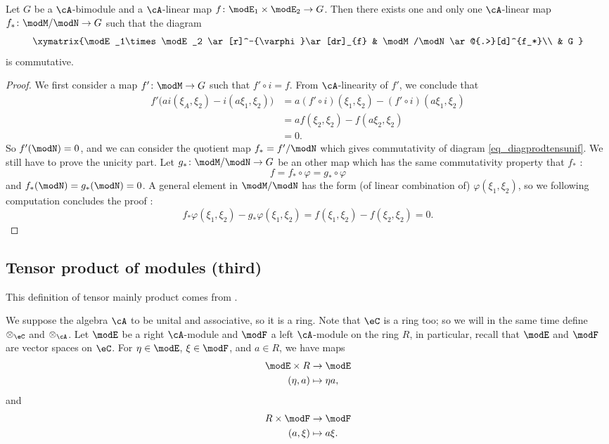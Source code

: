 \begin{proposition}
Let $G$ be a $\cA$-bimodule and a $\cA$-linear map $f\colon \modE_1\times\modE_2\to G$. Then there exists one and only one $\cA$-linear map $f_*\colon \modM/\modN\to G$ such that the diagram
\begin{equation}  \label{eq_diagprodtensunif}
\xymatrix{%
   \modE_1\times\modE_2 \ar[r]^-{\varphi}\ar[dr]_{f}		&	\modM/\modN\ar@{.>}[d]^{f_*}\\
   	&	G
}
\end{equation}
is commutative.
\end{proposition}

\begin{proof}
We first consider a map $f'\colon \modM\to G$ such that $f'\circ i=f$. From $\cA$-linearity of $f'$, we conclude that
\[ 
 \begin{split}
f'\big( ai(\xi_A,\xi_2)-i(a\xi_1,\xi_2) \big)&=a(f'\circ i)(\xi_1,\xi_2)-(f'\circ i)(a\xi_1,\xi_2)\\
		&=af(\xi_2,\xi_2)-f(a\xi_2,\xi_2)\\
		&=0.
\end{split} 
\]
So $f'(\modN)=0$, and we can consider the quotient map $f_*=f'/\modN$ which gives commutativity of diagram \eqref{eq_diagprodtensunif}. We still have to prove the unicity part. Let $g_*\colon \modM/\modN\to G$ be an other map which has the same commutativity property that $f_*$ :
\[ 
  f=f_*\circ \varphi=g_*\circ\varphi
\]
and $f_*(\modN)=g_*(\modN)=0$. A general element in $\modM/\modN$ has the form (of linear combination of) $\varphi(\xi_1,\xi_2)$, so we following computation concludes the proof :
\[ 
  f_*\varphi(\xi_1,\xi_2)-g_*\varphi(\xi_1,\xi_2)=f(\xi_1,\xi_2)-f(\xi_2,\xi_2)=0.
\]
\end{proof}

\subsection{Tensor product of modules (third)}

This definition of tensor mainly product comes from \cite{Jacobson_alg}.

We suppose the algebra $\cA$ to be unital and associative, so it is a ring. Note that $\eC$ is a ring too; so we will in the same time define $\otimes_{\eC}$ and $\otimes_{\cA}$. Let $\modE$ be a right $\cA$-module and $\modF$ a left $\cA$-module on the ring $R$, in particular, recall that $\modE$ and $\modF$ are vector spaces on $\eC$. For $\eta\in\modE$, $\xi\in\modF$, and $a\in R$, we have maps
\begin{equation}
\begin{aligned}
 \modE\times R&\to \modE \\ 
(\eta,a)&\mapsto \eta a, 
\end{aligned}
\end{equation} 
and
\begin{equation}
\begin{aligned}
 R\times\modF&\to \modF \\ 
(a,\xi)&\mapsto a\xi. 
\end{aligned}
\end{equation}

